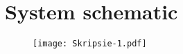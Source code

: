 \graphicspath{{appendices/fig/}}

\chapter{System schematic}
\makeatletter{}\makeatother
\label{appen:system}

\begin{figure}[!h]
    \centering
    \texttt{[image: Skripsie-1.pdf]}
\end{figure}
